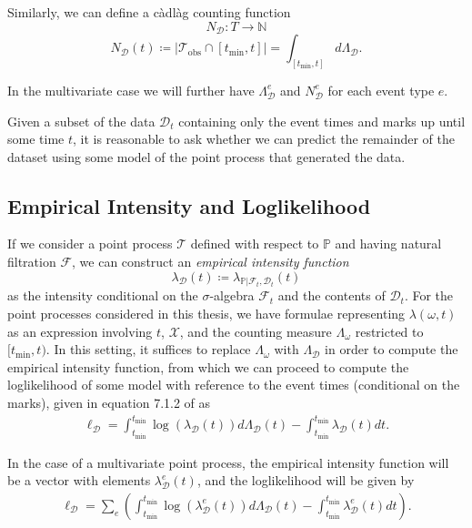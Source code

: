 \documentclass[honours,12pt]{unswthesis}
\numberwithin{equation}{section}
\begin{document}
Similarly, we can define a càdlàg counting function
$$N_\mathcal{D} : T \to \mathbb{N}$$
$$N_\mathcal{D}(t) \coloneq \left\vert \mathcal{T}_\mathrm{obs}\cap [t_\mathrm{min},t]\right\vert = \int_{[t_\mathrm{min},t]} d\Lambda_\mathcal{D}.$$

In the multivariate case we will further have $\Lambda_\mathcal{D}^e$ and $N_\mathcal{D}^e$ for each event type $e$.

Given a subset of the data $\mathcal{D}_t$ containing only the event times and marks up until some time $t$, it is reasonable to ask whether we can predict the remainder of the dataset using some model of the point process that generated the data.

\subsection{Empirical Intensity and Loglikelihood}
If we consider a point process $\mathcal{T}$ defined with respect to $\mathbb{P}$ and having natural filtration $\mathcal{F}$, we can construct an \textit{empirical intensity function}
$$\lambda_\mathcal{D}(t) \coloneq \lambda_{\mathbb{P}\vert\mathcal{F}_t,\mathcal{D}_t}(t)$$
as the intensity conditional on the $\sigma$-algebra $\mathcal{F}_t$ and the contents of $\mathcal{D}_t$. For the point processes considered in this thesis, we have formulae representing $\lambda(\omega,t)$ as an expression involving $t$, $\mathcal{X}$, and the counting measure $\Lambda_\omega$ restricted to $[t_\mathrm{min},t)$. In this setting, it suffices to replace $\Lambda_\omega$ with $\Lambda_\mathcal{D}$ in order to compute the empirical intensity function, from which we can proceed to compute the loglikelihood of some model with reference to the event times (conditional on the marks), given in equation 7.1.2 of \cite{DaleyVereJones} as
\begin{equation}
	\begin{align}
		\ell_\mathcal{D} = \int_{t_\mathrm{min}}^{t_\mathrm{min}} \log\left(\lambda_\mathcal{D}(t)\right)d\Lambda_\mathcal{D}(t) - \int_{t_\mathrm{min}}^{t_\mathrm{min}} \lambda_\mathcal{D}(t)dt.
	\end{align}
\end{equation}

In the case of a multivariate point process, the empirical intensity function will be a vector with elements $\lambda_\mathcal{D}^e(t)$, and the loglikelihood will be given by
\begin{equation}
	\begin{align}
		\ell_\mathcal{D} = \sum_e \left(\int_{t_\mathrm{min}}^{t_\mathrm{min}} \log\left(\lambda_\mathcal{D}^e(t)\right)d\Lambda_\mathcal{D}(t) - \int_{t_\mathrm{min}}^{t_\mathrm{min}} \lambda_\mathcal{D}^e(t)dt\right).
	\end{align}
\end{equation}
\end{document}
